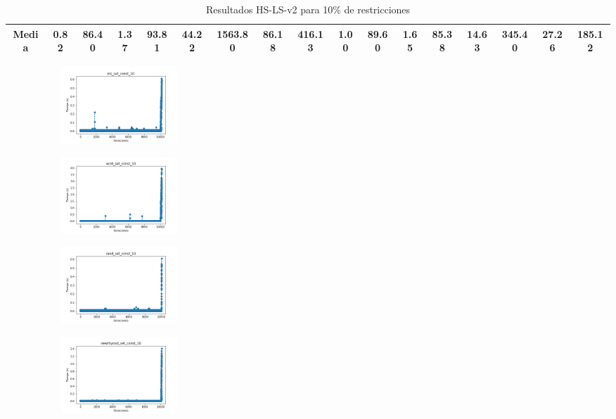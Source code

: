 \begin{table}[H]
{{\begin{tabular}{|| c || c c c c || c c c c || c c c c || c c c c ||}
            \\
            \hline\hline
            Media & 
0.82 & 86.40 & 1.37 & 93.81 & 44.22 & 1563.80 & 86.18 & 416.13 & 1.00 & 89.60 & 1.65 & 85.38 & 14.63 & 345.40 & 27.26 & 185.12
            \\
            \hline
        \end{tabular}
    }
    }
    \caption{Resultados HS-LS-v2 para 10\% de restricciones}
\end{table}

\vspace*{\fill}
\newpage
\vspace*{\fill}

\begin{figure}[H]    
    \centering
    \begin{subfigure}
        \centering
        \includegraphics[width=0.234\textwidth]{img/HS-LS-v2/iris_set_const_10_949004259_time.png}
    \end{subfigure}
    \hfill
    \begin{subfigure}
        \centering
        \includegraphics[width=0.234\textwidth]{img/HS-LS-v2/ecoli_set_const_10_949004259_time.png}
    \end{subfigure}
    \hfill
    \begin{subfigure}
        \centering
        \includegraphics[width=0.234\textwidth]{img/HS-LS-v2/rand_set_const_10_949004259_time.png}
    \end{subfigure}
    \hfill
    \begin{subfigure}
        \centering
        \includegraphics[width=0.234\textwidth]{img/HS-LS-v2/newthyroid_set_const_10_949004259_time.png}

\end{subfigure}
\end{figure}

